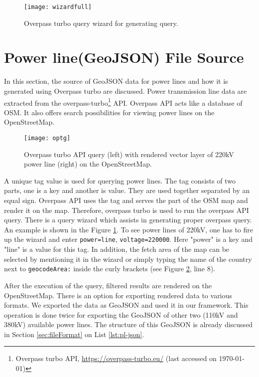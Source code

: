 \begin{figure} [H]
  \begin{center}
    \texttt{[image: wizardfull]}
    \caption{Overpass turbo query wizard for generating query.}
    \label{fig:wizard}
  \end{center}
\end{figure}

\section{Power line(GeoJSON) File Source}
\label{sec:plsource}

In this section, the source of GeoJSON data for power lines and how it is generated using Overpass turbo are discussed.
Power transmission line data are extracted from the overpass-turbo\footnote{Overpass turbo API, \url{https://overpass-turbo.eu/} (last accessed on {\today})} API. Overpass API acts like a database of OSM. It also offers search possibilities for viewing power lines on the OpenStreetMap. 

\begin{figure}
  \begin{center}
    \texttt{[image: optg]}
    \caption[Overpass turbo API]{Overpass turbo API query (left) with rendered vector layer of 220kV power line (right) on the OpenStreetMap.}
    \label{fig:optg}
  \end{center}
\end{figure} 

A unique tag value is used for querying power lines. The tag consists of two parts, one is a key and another is value. They are used together separated by an equal sign. Overpass API uses the tag and serves the part of the OSM map and render it on the map. Therefore, overpass turbo is used to run the overpass API query. There is a query wizard which assists in generating proper overpass query. An example is shown in the Figure \ref{fig:wizard}. To see power lines of 220kV, one has to fire up the wizard and enter \texttt{power=line}, \texttt{voltage=220000}. Here "power" is a key and "line" is a value for this tag. In addition, the fetch area of the map can be selected by mentioning it in the wizard or simply typing the name of the country next to \texttt{geocodeArea:} inside the curly brackets (see Figure \ref{fig:optg}, line 8).

After the execution of the query, filtered results are rendered on the OpenStreetMap. There is an option for exporting rendered data to various formats. We exported the data as GeoJSON and used it in our framework. This operation is done twice for exporting the GeoJSON of other two (110kV and 380kV) available power lines. The structure of this GeoJSON is already discussed in Section \ref{sec:fileFormat} on List \ref{lst:pl-json}.

 